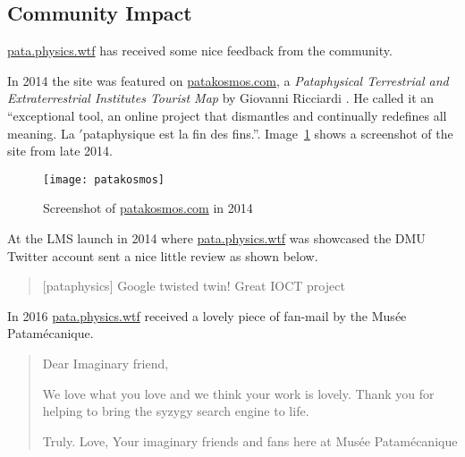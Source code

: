 \subsection{Community Impact}

\url{pata.physics.wtf} has received some nice feedback from the community. 

In 2014 the site was featured on \url{patakosmos.com}, a \textit{Pataphysical Terrestrial and Extraterrestrial Institutes Tourist Map} by Giovanni Ricciardi \autocite*{Ricciardi2014}. He called it an ``exceptional tool, an online project that dismantles and continually redefines all meaning. La $'$pataphysique est la fin des fins.''. Image~\ref{img:patakosmos} shows a screenshot of the site from late 2014.

\begin{figure}[!htbp]
  \centering
  \texttt{[image: patakosmos]}
\caption[Screenshot of \url{patakosmos.com} in 2014]{Screenshot of \url{patakosmos.com} in 2014}
\label{img:patakosmos}
\end{figure}

At the \ac{LMS} launch in 2014 where \url{pata.physics.wtf} was showcased the \ac{DMU} Twitter account sent a nice little review as shown below.

\begin{quotation}
  [pataphysics] Google twisted twin! Great IOCT project 
\end{quotation}

In 2016 \url{pata.physics.wtf} received a lovely piece of fan-mail by the Mus{\'e}e Patam{\'e}canique.

\begin{quotation}
  Dear Imaginary friend,

  We love what you love and we think your work is lovely. 
  Thank you for helping to bring the syzygy search engine to life.

  Truly. 
  Love,
  Your imaginary friends and fans here at Mus{\'e}e Patam{\'e}canique 
\end{quotation}


\stopcontents[chapters]
